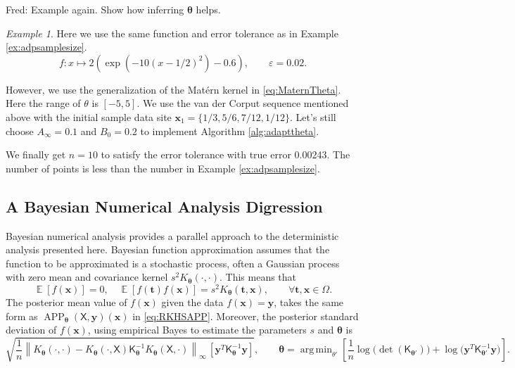 \documentclass[]{mcom-l}
\theoremstyle{remark}
\newtheorem{example}{Example}
\DeclareMathOperator*{\argmin}{arg\,min}
\DeclareMathOperator{\APP}{APP}
\DeclareMathOperator{\Ex}{\mathbb{E}}
\newcommand{\mK}{\mathsf{K}}
\newcommand{\mX}{\mathsf{X}}
\newcommand{\bx}{{\boldsymbol{x}}}
\newcommand{\by}{{\boldsymbol{y}}}
\newcommand{\bt}{{\boldsymbol{t}}}
\newcommand{\btheta}{{\boldsymbol{\theta}}}
\newcommand{\cx}{{\Omega}}
\newcommand{\norm}[2][{}]{\ensuremath{\left \lVert #2 \right \rVert}_{#1}}
\newcommand{\FredNote}[1]{{\color{blue}Fred: #1}}
\begin{document}
\FredNote{Example again. Show how inferring $\btheta$ helps.}

\begin{example}
\label{ex:adpattheta}
	Here we use the same function and error tolerance as in Example \ref{ex:adpsamplesize}.
	 \[f: x \mapsto 2 (\exp(-10(x-1/2)^2)- 0.6), \qquad \varepsilon = 0.02.\]

However, we use the generalization of the Mat\'ern kernel  in \eqref{eq:MaternTheta}. Here the range of $\theta$ is $[-5,5].$
We use the van der Corput sequence mentioned above with the initial sample data site $\bx_1=\{1/3, 5/6,7/12, 1/12\}$.
	Let's still choose  $A_\infty = 0.1$ and $B_0 =0.2$ to implement Algorithm
	\ref{alg:adapttheta}.
	
	We finally get $n=10$ to satisfy the error tolerance with true error 0.00243. The number of points is less than the number in Example \ref{ex:adpsamplesize}.
\end{example}

\subsection{A Bayesian Numerical Analysis Digression} \label{sec:Bayes}

Bayesian numerical analysis \cite{Dia88a,RasWil06a,Ste99} provides a parallel approach to the deterministic analysis presented here.  Bayesian function approximation assumes that the function to be approximated is a stochastic process, often a Gaussian process with zero mean and covariance kernel $s^2 K_\btheta(\cdot, \cdot)$.  This means that 
\begin{equation*}
\Ex[f(\bx)] = 0, \quad \Ex[f(\bt) f(\bx)] = s^2K_\btheta(\bt,\bx), \qquad \forall \bt, \bx \in \cx.
\end{equation*}
The posterior mean value of $f(\bx)$ given the data $f(\bx) = \by$, takes the same form as $\APP_\btheta(\mX,\by)(\bx)$ in \eqref{eq:RKHSAPP}.  Moreover, the posterior standard deviation of $f(\bx)$, using empirical Bayes to estimate the parameters $s$ and $\btheta$ is \cite{Hic17a,??}
\begin{equation*}
\sqrt{\frac 1n \norm[\infty]{K_\btheta(\cdot,\cdot) - K_\btheta(\cdot,\mX) \mK_\btheta^{-1} K_\btheta(\mX,\cdot)} \, [\by^T \mK_\btheta^{-1} \by] }, \qquad \btheta = \argmin_{\theta'}  \left[\frac 1n \log \bigl( \det(\mK_{\btheta'}) \bigr) + \log \bigl ( \by^T \mK_{\btheta'}^{-1} \by \bigr)\right].
\end{equation*}
\end{document}
